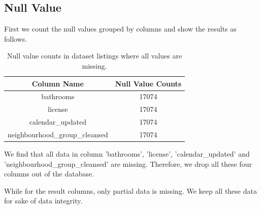 \documentclass{article}
\begin{document}
	\subsection{Null Value}
	First we count the null values grouped by columns and show the results as follows.
	\\
	\begin{table}[h]
		\centering
		\begin{tabular}{cc}
			\toprule
			Column Name                    & Null Value Counts \\
			\midrule
			bathrooms                      & 17074             \\
			license                        & 17074             \\
			calendar\_updated              & 17074             \\
			neighbourhood\_group\_cleansed & 17074    \\  \bottomrule      
		\end{tabular}
		\caption{Null value counts in dataset listings where all values are missing.}
	\end{table}
	
	
	\noindent We find that all data in column 'bathrooms', 'license', 'calendar\_updated' and 'neighbourhood\_group\_cleansed' are missing. Therefore, we drop all these four columns out of the database.
	
	\noindent While for the result columns, only partial data is missing. We keep all these data for sake of data integrity.
	
\end{document}
